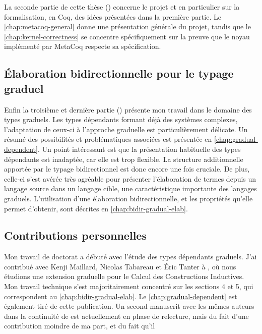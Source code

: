 La seconde partie de cette thèse ()
concerne le projet 
et en particulier sur la formalisation, en Coq, des idées présentées dans la
première partie. Le \cref{chap:metacoq-general} donne une présentation générale du
projet, tandis que le \cref{chap:kernel-correctness} se concentre spécifiquement
sur la preuve que le noyau implémenté par MetaCoq respecte sa spécification.

\subsection{Élaboration bidirectionnelle pour le typage graduel}

Enfin la troisième et dernière partie ()
présente mon travail
dans le domaine des types graduels. Les types dépendants formant déjà des systèmes
complexes, l’adaptation de ceux-ci à l’approche graduelle est particulièrement
délicate. Un résumé des possibilités et problématiques associées est présentée
en \cref{chap:gradual-dependent}.
Un point intéressant est que la présentation habituelle
des types dépendants est inadaptée,
car elle est trop flexible. La structure additionnelle apportée
par le typage bidirectionnel est donc encore une fois cruciale.
De plus, celle-ci s’est avérée très agréable pour présenter
l’élaboration de termes depuis un langage source dans un langage cible, une
caractéristique importante des langages graduels.
L’utilisation d’une élaboration bidirectionnelle, et les propriétés qu’elle
permet d’obtenir, sont décrites en \cref{chap:bidir-gradual-elab}.

\subsection{Contributions personnelles}

Mon travail de doctorat a débuté avec l’étude des types dépendants graduels.
J’ai contribué avec Kenji Maillard, Nicolas Tabareau et Éric Tanter à
, où nous étudions une extension graduelle
pour le Calcul des Constructions Inductives. Mon travail technique s’est
majoritairement concentré sur les sections 4 et 5,
qui correspondent au \cref{chap:bidir-gradual-elab}.
Le \cref{chap:gradual-dependent} est également tiré de cette publication.
Un second manuscrit avec les mêmes auteurs dans la continuité de
\cite{LennonBertrand2020} est actuellement en phase de relecture, mais du
fait d’une contribution moindre de ma part, et du fait qu’il

